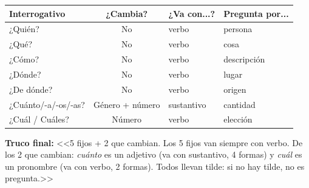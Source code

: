\documentclass[a4paper,10pt]{article}
\begin{document}
\vspace{4pt}
\begin{center}
\begin{tabular}{|l|c|l|l|}
\hline
\rowcolor{naranjainterr!20}
\textbf{Interrogativo} & \textbf{¿Cambia?} & \textbf{¿Va con...?} & \textbf{Pregunta por...} \\
\hline
¿Quién? & No & verbo & persona \\
\hline
\rowcolor{grisclaro}
¿Qué? & No & verbo & cosa \\
\hline
¿Cómo? & No & verbo & descripción \\
\hline
\rowcolor{grisclaro}
¿Dónde? & No & verbo & lugar \\
\hline
¿De dónde? & No & verbo & origen \\
\hline
\rowcolor{grisclaro}
¿Cuánto/-a/-os/-as? & Género + número & sustantivo & cantidad \\
\hline
¿Cuál / Cuáles? & Número & verbo & elección \\
\hline
\end{tabular}
\end{center}

\vspace{10pt}

\begin{trucointerr}
\textbf{Truco final:} <<5 fijos + 2 que cambian. Los 5 fijos van siempre con verbo. De los 2 que cambian: \textit{cuánto} es un adjetivo (va con sustantivo, 4 formas) y \textit{cuál} es un pronombre (va con verbo, 2 formas). Todos llevan tilde: si no hay tilde, no es pregunta.>>
\end{trucointerr}
\end{document}
